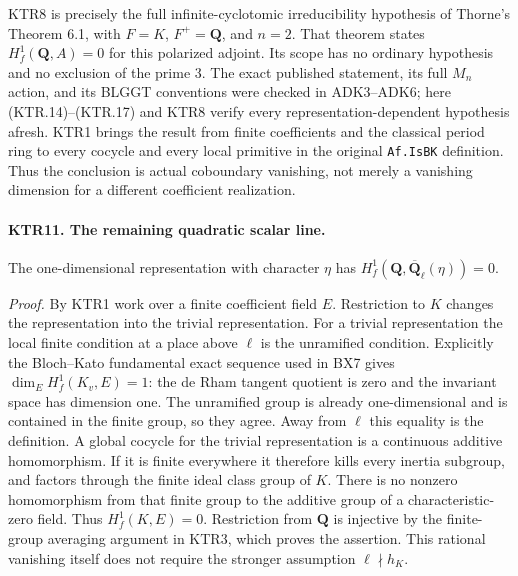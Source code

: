 KTR8 is precisely the full infinite-cyclotomic irreducibility
hypothesis of Thorne's Theorem 6.1, with \(F=K\),
\(F^+=\mathbf Q\), and \(n=2\).
That theorem states \(H^1_f(\mathbf Q,A)=0\) for this
polarized adjoint.  Its scope has no ordinary hypothesis and
no exclusion of the prime \(3\).  The exact published
statement, its full \(M_n\) action, and its BLGGT conventions
were checked in ADK3--ADK6; here (KTR.14)--(KTR.17) and KTR8
verify every representation-dependent hypothesis afresh.
KTR1 brings the result from finite coefficients and the classical
period ring to every cocycle and every local primitive in the
original \texttt{Af.IsBK} definition.  Thus the conclusion
is actual coboundary vanishing, not merely a vanishing dimension
for a different coefficient realization.

\paragraph{KTR11. The remaining quadratic scalar line.}
\label{claim:KTR11}
The one-dimensional representation with character \(\eta\)
has \(H^1_f(\mathbf Q,\overline{\mathbf Q}_\ell(\eta))=0\).

\emph{Proof.}
By KTR1 work over a finite coefficient field \(E\).
Restriction to \(K\) changes the representation into the
trivial representation.  For a trivial representation the local
finite condition at a place above \(\ell\) is the unramified
condition.  Explicitly the Bloch--Kato fundamental exact sequence
used in BX7 gives \(\dim_E H^1_f(K_v,E)=1\): the de Rham
tangent quotient is zero and the invariant space has dimension
one.  The unramified group is already one-dimensional and is
contained in the finite group, so they agree.  Away from
\(\ell\) this equality is the definition.  A global cocycle
for the trivial representation is a continuous additive
homomorphism.  If it is finite everywhere it therefore kills
every inertia subgroup, and factors through the finite ideal
class group of \(K\).  There is no nonzero homomorphism from
that finite group to the additive group of a characteristic-zero
field.  Thus \(H^1_f(K,E)=0\).  Restriction from \(\mathbf Q\)
is injective by the finite-group averaging argument in KTR3,
which proves the assertion.  This rational vanishing itself
does not require the stronger assumption \(\ell\nmid h_K\).

